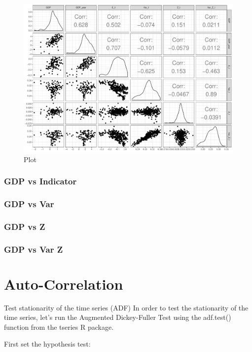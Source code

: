 \documentclass[12pt,a4paper,oneside]{book}
\begin{document}
\begin{figure}[H]
    \centering
    \includegraphics[scale=0.5]{Graphs/ggpairs2.pdf}
    \caption{Plot }
    \label{fig:ggpairs2}
\end{figure}

\subsubsection{GDP vs Indicator}

\subsubsection{GDP vs Var}

\subsubsection{GDP vs Z}

\subsubsection{GDP vs Var Z}




\section{Auto-Correlation}

Test stationarity of the time series (ADF)
In order to test the stationarity of the time series, let’s run the Augmented Dickey-Fuller Test using the adf.test() function from the tseries R package.

First set the hypothesis test:
\end{document}
